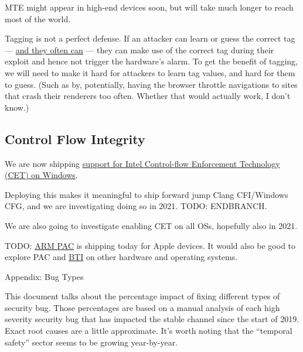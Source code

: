 \documentclass[a4paper,12pt,notitlepage,twoside,openright]{article}
\begin{document}
{MTE might appear in high-end devices soon, but will take much longer to
reach most of the world.

Tagging is not a perfect defense. If an attacker can learn or guess the
correct tag
--- \href{https://www.google.com/url?q=https://googleprojectzero.blogspot.com/2019/02/examining-pointer-authentication-on.html\&sa=D\&source=editors\&ust=1631944129118000\&usg=AOvVaw1gThhNgANrziuAi11Pvu4v}{and
they often can} --- they can make use of the correct tag during their
exploit and hence not trigger the hardware's alarm. To get the benefit
of tagging, we will need to make it hard for attackers to learn tag
values, and hard for them to guess. (Such as by, potentially, having the
browser throttle navigations to sites that crash their renderers too
often. Whether that would actually work, I don't know.)

\subsection{Control Flow Integrity}

We are now
shipping \href{https://www.google.com/url?q=https://security.googleblog.com/2021/05/enabling-hardware-enforced-stack.html\&sa=D\&source=editors\&ust=1631944129119000\&usg=AOvVaw2rim68EVFlBXjFhBDe4leE}{support
for Intel Control-flow Enforcement Technology (CET) on Windows}.

Deploying this makes it meaningful to ship forward jump Clang
CFI/Windows CFG, and we are investigating doing so in 2021. TODO:
ENDBRANCH.

We are also going to investigate enabling CET on all OSs, hopefully also
in 2021.

TODO: \href{https://www.google.com/url?q=https://developer.apple.com/documentation/security/preparing_your_app_to_work_with_pointer_authentication\&sa=D\&source=editors\&ust=1631944129120000\&usg=AOvVaw3jurZceu1ptrIB_GQl8_Uy}{ARM
PAC} is shipping today for Apple devices. It would also be good to
explore PAC
and \href{https://www.google.com/url?q=https://developer.arm.com/documentation/ddi0596/2020-12/Base-Instructions/BTI--Branch-Target-Identification-\&sa=D\&source=editors\&ust=1631944129120000\&usg=AOvVaw0EN5YPuPn3O35XJKNmysBM}{BTI} on
other hardware and operating systems.

Appendix: Bug Types

This document talks about the percentage impact of fixing different
types of security bug. Those percentages are based on a manual analysis
of each high severity security bug that has impacted the stable channel
since the start of 2019. Exact root causes are a little approximate.
It's worth noting that the ``temporal safety'' sector seems to be
growing year-by-year.

}
\end{document}

